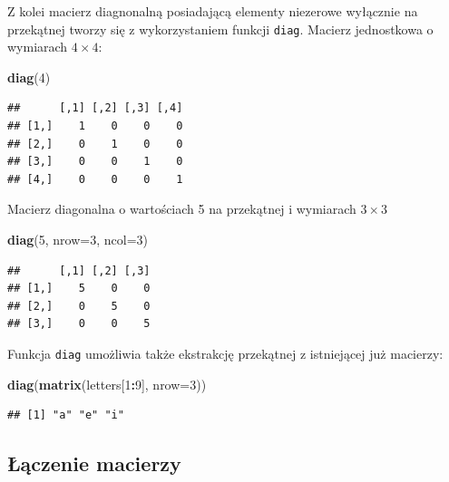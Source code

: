 \documentclass[]{book}
\newenvironment{Shaded}{\begin{snugshade}}{\end{snugshade}}
\newcommand{\KeywordTok}[1]{\textcolor[rgb]{0.13,0.29,0.53}{\textbf{#1}}}
\newcommand{\DataTypeTok}[1]{\textcolor[rgb]{0.13,0.29,0.53}{#1}}
\newcommand{\DecValTok}[1]{\textcolor[rgb]{0.00,0.00,0.81}{#1}}
\newcommand{\OperatorTok}[1]{\textcolor[rgb]{0.81,0.36,0.00}{\textbf{#1}}}
\newcommand{\NormalTok}[1]{#1}
\begin{document}
Z kolei macierz diagnonalną posiadającą elementy niezerowe wyłącznie na
przekątnej tworzy się z wykorzystaniem funkcji \texttt{diag}. Macierz
jednostkowa o wymiarach \(4 \times 4\):

\begin{Shaded}
\begin{Highlighting}[]
\KeywordTok{diag}\NormalTok{(}\DecValTok{4}\NormalTok{)}
\end{Highlighting}
\end{Shaded}

\begin{verbatim}
##      [,1] [,2] [,3] [,4]
## [1,]    1    0    0    0
## [2,]    0    1    0    0
## [3,]    0    0    1    0
## [4,]    0    0    0    1
\end{verbatim}

Macierz diagonalna o wartościach 5 na przekątnej i wymiarach
\(3 \times 3\)

\begin{Shaded}
\begin{Highlighting}[]
\KeywordTok{diag}\NormalTok{(}\DecValTok{5}\NormalTok{, }\DataTypeTok{nrow=}\DecValTok{3}\NormalTok{, }\DataTypeTok{ncol=}\DecValTok{3}\NormalTok{)}
\end{Highlighting}
\end{Shaded}

\begin{verbatim}
##      [,1] [,2] [,3]
## [1,]    5    0    0
## [2,]    0    5    0
## [3,]    0    0    5
\end{verbatim}

Funkcja \texttt{diag} umożliwia także ekstrakcję przekątnej z
istniejącej już macierzy:

\begin{Shaded}
\begin{Highlighting}[]
\KeywordTok{diag}\NormalTok{(}\KeywordTok{matrix}\NormalTok{(letters[}\DecValTok{1}\OperatorTok{:}\DecValTok{9}\NormalTok{], }\DataTypeTok{nrow=}\DecValTok{3}\NormalTok{))}
\end{Highlighting}
\end{Shaded}

\begin{verbatim}
## [1] "a" "e" "i"
\end{verbatim}

\subsection{Łączenie macierzy}\label{aczenie-macierzy}
\end{document}
